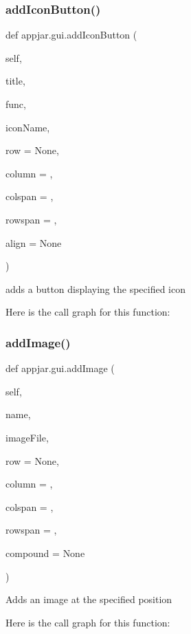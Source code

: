 \subsubsection{\texorpdfstring{add\+Icon\+Button()}{addIconButton()}}
{\footnotesize\ttfamily def appjar.\+gui.\+add\+Icon\+Button (\begin{DoxyParamCaption}\item[{}]{self,  }\item[{}]{title,  }\item[{}]{func,  }\item[{}]{icon\+Name,  }\item[{}]{row = {\ttfamily None},  }\item[{}]{column = {},  }\item[{}]{colspan = {},  }\item[{}]{rowspan = {},  }\item[{}]{align = {\ttfamily None} }\end{DoxyParamCaption})}

\begin{DoxyVerb}adds a button displaying the specified icon \end{DoxyVerb}
 Here is the call graph for this function\+:
\mbox{\label{classappjar_1_1gui_aab755e0cfb436daccfd914e834c01c53}} 
\subsubsection{\texorpdfstring{add\+Image()}{addImage()}}
{\footnotesize\ttfamily def appjar.\+gui.\+add\+Image (\begin{DoxyParamCaption}\item[{}]{self,  }\item[{}]{name,  }\item[{}]{image\+File,  }\item[{}]{row = {\ttfamily None},  }\item[{}]{column = {},  }\item[{}]{colspan = {},  }\item[{}]{rowspan = {},  }\item[{}]{compound = {\ttfamily None} }\end{DoxyParamCaption})}

\begin{DoxyVerb}Adds an image at the specified position \end{DoxyVerb}
 Here is the call graph for this function\+:
\mbox{\label{classappjar_1_1gui_a3521399bb981d9d5b6af254c14a3b690}} 
